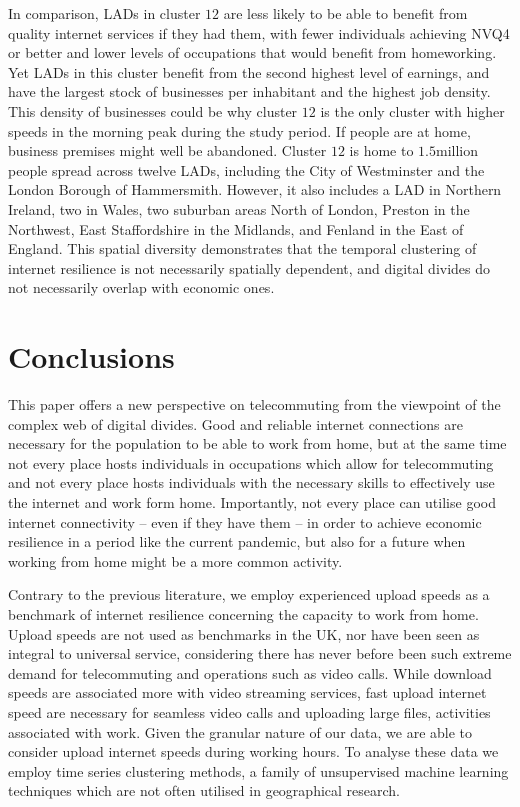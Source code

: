 \documentclass[Royal,times,sageh]{sagej}
\begin{document}
In comparison, LADs in cluster \(12\) are less likely to be able to
benefit from quality internet services if they had them, with fewer
individuals achieving NVQ4 or better and lower levels of occupations
that would benefit from homeworking. Yet LADs in this cluster benefit
from the second highest level of earnings, and have the largest stock of
businesses per inhabitant and the highest job density. This density of
businesses could be why cluster \(12\) is the only cluster with higher
speeds in the morning peak during the study period. If people are at
home, business premises might well be abandoned. Cluster \(12\) is home
to \(1.5\)million people spread across twelve LADs, including the City
of Westminster and the London Borough of Hammersmith. However, it also
includes a LAD in Northern Ireland, two in Wales, two suburban areas
North of London, Preston in the Northwest, East Staffordshire in the
Midlands, and Fenland in the East of England. This spatial diversity
demonstrates that the temporal clustering of internet resilience is not
necessarily spatially dependent, and digital divides do not necessarily
overlap with economic ones.

\hypertarget{sec:5}{%
\section{Conclusions}\label{sec:5}}

This paper offers a new perspective on telecommuting from the viewpoint
of the complex web of digital divides. Good and reliable internet
connections are necessary for the population to be able to work from
home, but at the same time not every place hosts individuals in
occupations which allow for telecommuting and not every place hosts
individuals with the necessary skills to effectively use the internet
and work form home. Importantly, not every place can utilise good
internet connectivity -- even if they have them -- in order to achieve
economic resilience in a period like the current pandemic, but also for
a future when working from home might be a more common activity.

Contrary to the previous literature, we employ experienced upload speeds
as a benchmark of internet resilience concerning the capacity to work
from home. Upload speeds are not used as benchmarks in the UK, nor have
been seen as integral to universal service, considering there has never
before been such extreme demand for telecommuting and operations such as
video calls. While download speeds are associated more with video
streaming services, fast upload internet speed are necessary for
seamless video calls and uploading large files, activities associated
with work. Given the granular nature of our data, we are able to
consider upload internet speeds during working hours. To analyse these
data we employ time series clustering methods, a family of unsupervised
machine learning techniques which are not often utilised in geographical
research.
\end{document}
